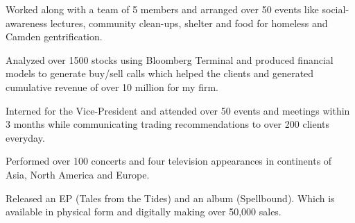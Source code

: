 \documentclass[]{deedy-resume-openfont}
\begin{document}
\begin{minipage}[t]{0.66\textwidth}
\begin{tightemize}
\item Worked along with a team of 5 members and arranged over 50 events like social-awareness lectures, community clean-ups, shelter and food for homeless and Camden gentrification.\end{tightemize}
\sectionsep

\begin{tightemize}
\item Analyzed over 1500 stocks using Bloomberg Terminal and produced financial models to generate buy/sell calls which helped the clients and generated cumulative revenue of over 10 million for my firm.\end{tightemize}
\sectionsep

\begin{tightemize}
\item Interned for the Vice-President and attended over 50 events and meetings within 3 months while communicating trading recommendations to over 200 clients everyday.
\end{tightemize}
\sectionsep


\begin{tightemize}
\item Performed over 100 concerts and four television appearances in continents of Asia, North America and Europe.\item Released an EP (Tales from the Tides) and an album (Spellbound). Which is available in physical form and digitally making over 50,000 sales.
\end{tightemize}
\sectionsep





\end{minipage} 
\end{document}
